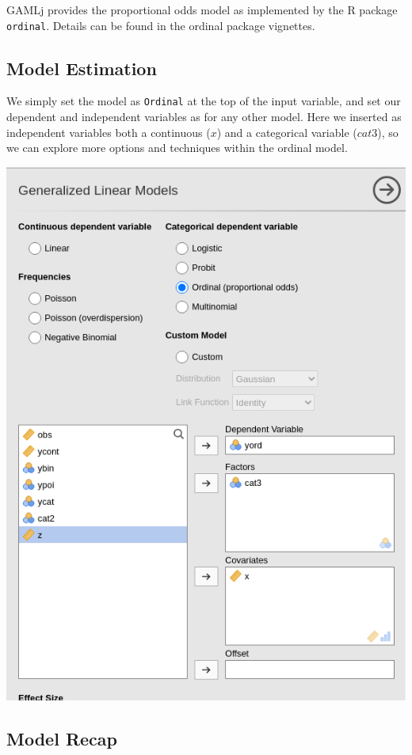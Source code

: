 \documentclass[
]{book}
\begin{document}
{GAMLj} provides the proportional odds model as implemented by the R package \texttt{ordinal}. Details can be found in the ordinal package vignettes.

\hypertarget{model-estimation-3}{%
\subsection{Model Estimation}\label{model-estimation-3}}

We simply set the model as \texttt{Ordinal} at the top of the input variable, and set our dependent and independent variables as for any other model. Here we inserted as independent variables both a continuous (\(x\)) and a categorical variable (\(cat3\)), so we can explore more options and techniques within the ordinal model.

\includegraphics[width=7.96in]{bookletpics/3_ordinal_input1}

\hypertarget{model-recap-3}{%
\subsection{Model Recap}\label{model-recap-3}}
\end{document}
